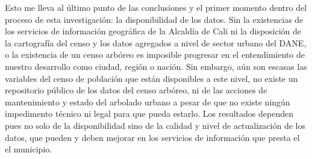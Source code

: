 \documentclass[12pt,]{book}
\begin{document}
Esto me lleva al último punto de las conclusiones y el primer momento
dentro del proceso de esta investigación: la disponibilidad de los
datos. Sin la existencias de los servicios de información geográfica de
la Alcaldía de Cali ni la disposición de la cartografía del censo y los
datos agregados a nivel de sector urbano del DANE, o la existencia de un
censo arbóreo es imposible progresar en el entendimiento de nuestro
desarrollo como ciudad, región o nación. Sin embargo, aún son escasas
las variables del censo de población que están disponibles a este nivel,
no existe un repositorio público de los datos del censo arbóreo, ni de
las acciones de mantenimiento y estado del arbolado urbano a pesar de
que no existe ningún impedimento técnico ni legal para que pueda
estarlo. Los resultados dependen pues no solo de la disponibilidad sino
de la calidad y nivel de actualización de los datos, que pueden y deben
mejorar en los servicios de información que presta el el municipio.


\end{document}
